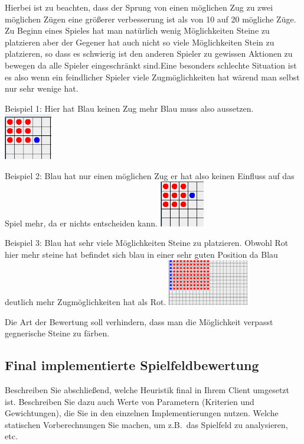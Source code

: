 \documentclass[12pt,a4paper,bibliography=totocnumbered,listof=totocnumbered]{scrartcl}
\begin{document}
Hierbei ist zu beachten, dass der Sprung von einen möglichen Zug zu zwei möglichen Zügen eine größerer verbesserung ist als von 10 auf 20 mögliche Züge.
Zu Beginn eines Spieles hat man natürlich wenig Möglichkeiten Steine zu platzieren aber der Gegener hat auch nicht so viele Möglichkeiten Stein zu platzieren, so dass es schwierig ist den anderen Spieler zu gewissen Aktionen zu bewegen da alle Spieler eingeschränkt sind.Eine besonders schlechte Situation ist es also wenn ein feindlicher Spieler viele Zugmöglichkeiten hat wärend man selbst nur sehr wenige hat.

Beispiel 1: Hier hat Blau keinen Zug mehr Blau muss also aussetzen.
\newline
\includegraphics[height=2cm]{pics/BlauKeinZug}

Beispiel 2: Blau hat nur einen möglichen Zug er hat also keinen Einfluss auf das Spiel mehr, da er nichts entscheiden kann.
\newline
\includegraphics[height=2cm]{pics/BlauEinZug}

Beispiel 3: Blau hat sehr viele Möglichkeiten Steine zu platzieren. Obwohl Rot hier mehr steine hat befindet sich blau in einer sehr guten Position da Blau deutlich mehr Zugmöglichkeiten hat als Rot.
\newline
\includegraphics[height=2cm]{pics/BlauVieleZuege}
 
Die Art der Bewertung soll verhindern, dass man die Möglichkeit verpasst gegnerische Steine zu färben.








\subsection{Final implementierte Spielfeldbewertung}
Beschreiben Sie abschließend, welche Heuristik final in Ihrem Client umgesetzt ist. Beschreiben Sie dazu auch Werte von Parametern (Kriterien und Gewichtungen), die Sie in den einzelnen Implementierungen nutzen. Welche statischen Vorberechnungen Sie machen, um z.B.\ das Spielfeld zu analysieren, etc.
\end{document}
